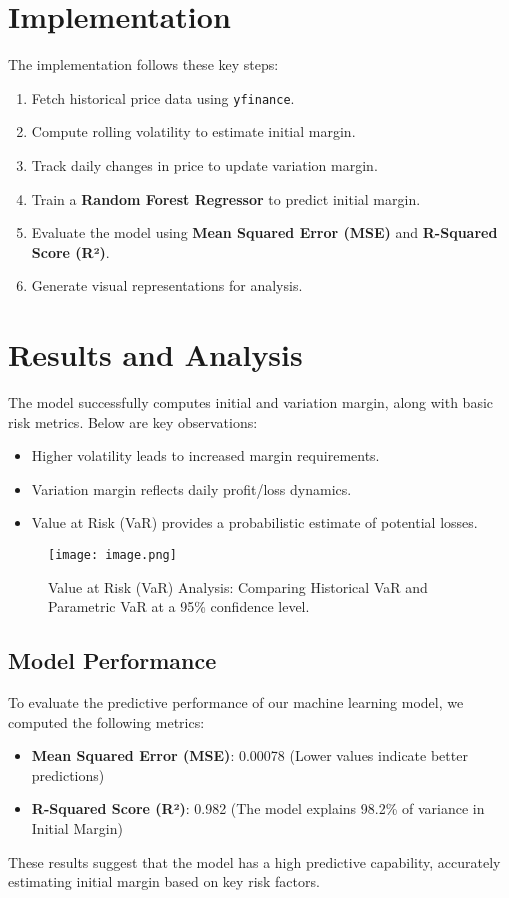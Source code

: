 \documentclass[a4paper,12pt]{article}
\begin{document}
\section{Implementation}
The implementation follows these key steps:
\begin{enumerate}
    \item Fetch historical price data using \texttt{yfinance}.
    \item Compute rolling volatility to estimate initial margin.
    \item Track daily changes in price to update variation margin.
    \item Train a \textbf{Random Forest Regressor} to predict initial margin.
    \item Evaluate the model using \textbf{Mean Squared Error (MSE)} and \textbf{R-Squared Score (R²)}.
    \item Generate visual representations for analysis.
\end{enumerate}

\section{Results and Analysis}
The model successfully computes initial and variation margin, along with basic risk metrics. Below are key observations:
\begin{itemize}
    \item Higher volatility leads to increased margin requirements.
    \item Variation margin reflects daily profit/loss dynamics.
    \item Value at Risk (VaR) provides a probabilistic estimate of potential losses.
\end{itemize}
\begin{figure}[h]
    \centering
    \texttt{[image: image.png]}
    \caption{Value at Risk (VaR) Analysis: Comparing Historical VaR and Parametric VaR at a 95\% confidence level.}
    \label{fig:var_analysis}
\end{figure}

\subsection{Model Performance}
To evaluate the predictive performance of our machine learning model, we computed the following metrics:
\begin{itemize}
    \item \textbf{Mean Squared Error (MSE)}: 0.00078 (Lower values indicate better predictions)
    \item \textbf{R-Squared Score (R²)}: 0.982 (The model explains 98.2\% of variance in Initial Margin)
\end{itemize}
These results suggest that the model has a high predictive capability, accurately estimating initial margin based on key risk factors.
\end{document}
